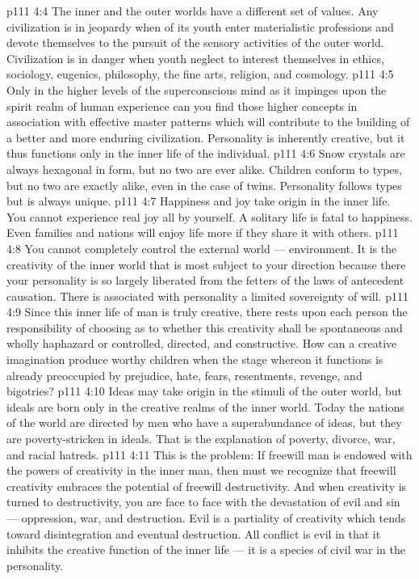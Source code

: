 \vs p111 4:4 The inner and the outer worlds have a different set of values. Any civilization is in jeopardy when  of its youth enter materialistic professions and devote themselves to the pursuit of the sensory activities of the outer world. Civilization is in danger when youth neglect to interest themselves in ethics, sociology, eugenics, philosophy, the fine arts, religion, and cosmology.
\vs p111 4:5 Only in the higher levels of the superconscious mind as it impinges upon the spirit realm of human experience can you find those higher concepts in association with effective master patterns which will contribute to the building of a better and more enduring civilization. Personality is inherently creative, but it thus functions only in the inner life of the individual.
\vs p111 4:6 \pc Snow crystals are always hexagonal in form, but no two are ever alike. Children conform to types, but no two are exactly alike, even in the case of twins. Personality follows types but is always unique.
\vs p111 4:7 \pc Happiness and joy take origin in the inner life. You cannot experience real joy all by yourself. A solitary life is fatal to happiness. Even families and nations will enjoy life more if they share it with others.
\vs p111 4:8 \pc You cannot completely control the external world --- environment. It is the creativity of the inner world that is most subject to your direction because there your personality is so largely liberated from the fetters of the laws of antecedent causation. There is associated with personality a limited sovereignty of will.
\vs p111 4:9 Since this inner life of man is truly creative, there rests upon each person the responsibility of choosing as to whether this creativity shall be spontaneous and wholly haphazard or controlled, directed, and constructive. How can a creative imagination produce worthy children when the stage whereon it functions is already preoccupied by prejudice, hate, fears, resentments, revenge, and bigotries?
\vs p111 4:10 Ideas may take origin in the stimuli of the outer world, but ideals are born only in the creative realms of the inner world. Today the nations of the world are directed by men who have a superabundance of ideas, but they are poverty\hyp{}stricken in ideals. That is the explanation of poverty, divorce, war, and racial hatreds.
\vs p111 4:11 This is the problem: If freewill man is endowed with the powers of creativity in the inner man, then must we recognize that freewill creativity embraces the potential of freewill destructivity. And when creativity is turned to destructivity, you are face to face with the devastation of evil and sin --- oppression, war, and destruction. Evil is a partiality of creativity which tends toward disintegration and eventual destruction. All conflict is evil in that it inhibits the creative function of the inner life --- it is a species of civil war in the personality.
